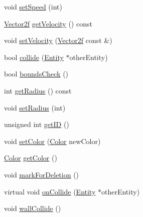 \begin{DoxyCompactItemize}
\item 
void \hyperlink{classEntity_a2c6aaac44b0994328567b0311849c627}{set\-Speed} (int)
\item 
\hyperlink{classVector2}{Vector2f} \hyperlink{classEntity_a0217810f5096f6c0d04212d3cc1a935a}{get\-Velocity} () const 
\item 
void \hyperlink{classEntity_a03b1fc7ec44fe29fb946b86d6fe65842}{set\-Velocity} (\hyperlink{classVector2}{Vector2f} const \&)
\item 
bool \hyperlink{classEntity_a634c100994978b5ee96f8802e052a2d4}{collide} (\hyperlink{classEntity}{Entity} $\ast$other\-Entity)
\item 
bool \hyperlink{classEntity_a5591db8c22280b2157794be2841cb5a2}{bounds\-Check} ()
\item 
int \hyperlink{classEntity_ac2f290a20927f548e8742976b222a556}{get\-Radius} () const 
\item 
void \hyperlink{classEntity_ae5e084e71667daf1b18fc94b2cb8f363}{set\-Radius} (int)
\item 
unsigned int \hyperlink{classEntity_a69bd5fbeece40ba87d1e6f693f41d9ff}{get\-I\-D} ()
\item 
void \hyperlink{classEntity_a4992b9b8d1d9ef8f6d90ee20a053262c}{set\-Color} (\hyperlink{classColor}{Color} new\-Color)
\item 
\hyperlink{classColor}{Color} \hyperlink{classEntity_a9e60f2350275170500f33bcb8e57f3bc}{get\-Color} ()
\item 
void \hyperlink{classEntity_a4ff4124f2dfef873a2219b68f17bdfe5}{mark\-For\-Deletion} ()
\item 
virtual void \hyperlink{classEntity_a8e8ddac9be28d59f187a51e0fca0f056}{on\-Collide} (\hyperlink{classEntity}{Entity} $\ast$other\-Entity)
\item 
void \hyperlink{classEntity_a571c43e10649639994469f4229078fa0}{wall\-Collide} ()
\end{DoxyCompactItemize}

